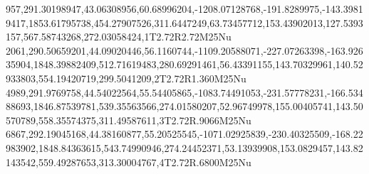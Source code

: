 957,291.30198947,43.06308956,60.68996204,-1208.07128768,-191.8289975,-143.39819417,1853.61795738,454.27907526,311.6447249,63.73457712,153.43902013,127.5393157,567.58743268,272.03058424,1T2.72R2.72M25Nu
2061,290.50659201,44.09020446,56.1160744,-1109.20588071,-227.07263398,-163.92635904,1848.39882409,512.71619483,280.69291461,56.43391155,143.70329961,140.52933803,554.19420719,299.5041209,2T2.72R1.360M25Nu
4989,291.9769758,44.54022564,55.54405865,-1083.74491053,-231.57778231,-166.53488693,1846.87539781,539.35563566,274.01580207,52.96749978,155.00405741,143.50570789,558.35574375,311.49587611,3T2.72R.9066M25Nu
6867,292.19045168,44.38160877,55.20525545,-1071.02925839,-230.40325509,-168.22983902,1848.84363615,543.74990946,274.24452371,53.13939908,153.0829457,143.82143542,559.49287653,313.30004767,4T2.72R.6800M25Nu
